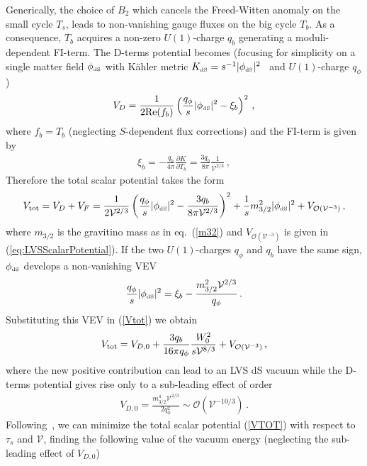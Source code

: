 \documentclass[12pt,a4paper]{book}
\def\dS{{\scriptscriptstyle \rm dS}}
\newcommand{\mc}{\mathcal}
\begin{document}
Generically, the choice of $B_2$ which cancels the Freed-Witten anomaly on the small cycle $T_s$, leads to non-vanishing gauge fluxes on the big cycle $T_b$. As a consequence, $T_b$ acquires a non-zero $U(1)$-charge $q_b$
generating a moduli-dependent FI-term. The D-terms potential becomes (focusing for simplicity on a single matter field $\phi_\dS$ with K\"ahler metric $K_\dS= s^{-1}|\phi_\dS|^2$~\cite{Conlon:2006tj, Aparicio:2008wh} and $U(1)$-charge $q_\phi$)
\begin{align}
\label{dmatter}
V_D = \frac{1}{2{\rm Re}(f_b)} \left(\frac{q_\phi}{s} |\phi_\dS|^2 - \xi_b\right)^2\,,
\end{align}
where $f_b = T_b$ (neglecting $S$-dependent flux corrections) and the FI-term is given by
\begin{align}
\xi_b = - \frac{q_b}{4\pi} \frac{\partial K}{\partial T_b} = \frac{3 q_b}{8\pi}\frac{1}{\mathcal{V}^{2/3}}\,,
\end{align}
Therefore the total scalar potential takes the form
\begin{align}
V_{\rm tot} = V_D + V_F =  \frac{1}{2\mathcal{V}^{2/3}} \left(\frac{q_\phi}{s}  |\phi_\dS|^2 - \frac{3 q_b}{8\pi\mathcal{V}^{2/3}}\right)^2
+ \frac{1}{s} m_{3/2}^2 |\phi_\dS|^2 + V_{\mc{O}(\mathcal{V}^{-3})}\,,
\label{Vtot}
\end{align}
where $m_{3/2}$ is the gravitino mass as in eq.~(\ref{m32}) and $V_{\mc{O}(\mathcal{V}^{-3})}$ is given in (\ref{eq:LVSScalarPotential}). If the two $U(1)$-charges $q_\phi$ and $q_b$ have the same sign, $\phi_\dS$ develops a non-vanishing VEV
\begin{align}
\label{minphi}
\frac{q_\phi}{s} |\phi_\dS|^2 = \xi_b - \frac{m_{3/2}^2 \mathcal{V}^{2/3}}{q_\phi}\,.
\end{align}
Substituting this VEV in (\ref{Vtot}) we obtain
\begin{align}
V_{\rm tot} = V_{D,0}+\frac{3 q_b}{16\pi q_\phi} \frac{W_0^2}{s  \mathcal{V}^{8/3}}+V_{\mc{O}(\mathcal{V}^{-3})}\,,
\label{VTOT}
\end{align}
where the new positive contribution can lead to an LVS dS vacuum while the D-terms potential gives rise only to a sub-leading effect of order
\begin{align}
V_{D,0} = \frac{m_{3/2}^4 \mathcal{V}^{2/3}}{2 q_\phi^2}\sim \mc{O}\left(\mathcal{V}^{-10/3}\right)\,.
\label{VD0ds1}
\end{align}
Following~\cite{Cicoli:2012vw}, we can minimize the total scalar potential (\ref{VTOT}) with respect to $\tau_s$ and $\mathcal{V}$, finding the following value of the vacuum energy (neglecting the sub-leading effect of $V_{D,0}$)
\end{document}
